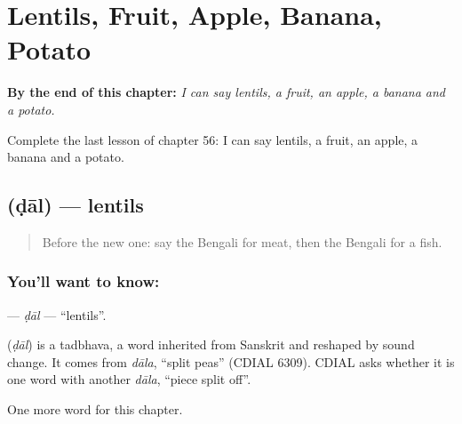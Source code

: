
\chapter{Lentils, Fruit, Apple, Banana, Potato}
\label{ch:bn-lentils-fruit-apple-banana-potato}

\begin{chapteropening}
\textbf{By the end of this chapter:} \emph{I can say lentils, a fruit, an apple, a banana and a potato.}

Complete the last lesson of chapter 56: I can say lentils, a fruit, an apple, a banana and a potato.
\end{chapteropening}

\section[\texorpdfstring{\bn{ডাল} (ḍāl)}{ডাল (ḍāl)}]{ (ḍāl) — lentils}

\label{lesson:BN-C56-dal}



\begin{quote}
Before the new one: say the Bengali for meat, then the Bengali for a fish.
\end{quote}

\subsection*{You'll want to know: }
\textbf{} — \emph{ḍāl} — \textquotedblleft{}lentils\textquotedblright{}.

\begin{cousinweb}
\textbf{} (\emph{ḍāl}) is a tadbhava, a word inherited from Sanskrit and reshaped by sound change. It comes from \emph{dāla}, \textquotedblleft{}split peas\textquotedblright{} (CDIAL 6309). CDIAL asks whether it is one word with another \emph{dāla}, \textquotedblleft{}piece split off\textquotedblright{}.
\end{cousinweb}

\begin{grammarlens}[title={What you've built}]
One more word for this chapter.
\end{grammarlens}

